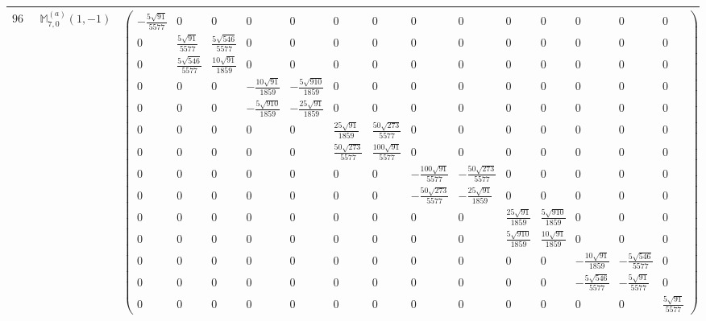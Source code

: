 \documentclass[fleqn,8pt,landscape]{jsarticle}
\begin{document}
\begin{center}
\begin{longtable}{ccc}
$ 969 $ & $ \mathbb{M}_{7,0}^{(a)}(1,-1) $ & $ \begin{pmatrix} - \frac{5 \sqrt{91}}{5577} & 0 & 0 & 0 & 0 & 0 & 0 & 0 & 0 & 0 & 0 & 0 & 0 & 0 \\ 0 & \frac{5 \sqrt{91}}{5577} & \frac{5 \sqrt{546}}{5577} & 0 & 0 & 0 & 0 & 0 & 0 & 0 & 0 & 0 & 0 & 0 \\ 0 & \frac{5 \sqrt{546}}{5577} & \frac{10 \sqrt{91}}{1859} & 0 & 0 & 0 & 0 & 0 & 0 & 0 & 0 & 0 & 0 & 0 \\ 0 & 0 & 0 & - \frac{10 \sqrt{91}}{1859} & - \frac{5 \sqrt{910}}{1859} & 0 & 0 & 0 & 0 & 0 & 0 & 0 & 0 & 0 \\ 0 & 0 & 0 & - \frac{5 \sqrt{910}}{1859} & - \frac{25 \sqrt{91}}{1859} & 0 & 0 & 0 & 0 & 0 & 0 & 0 & 0 & 0 \\ 0 & 0 & 0 & 0 & 0 & \frac{25 \sqrt{91}}{1859} & \frac{50 \sqrt{273}}{5577} & 0 & 0 & 0 & 0 & 0 & 0 & 0 \\ 0 & 0 & 0 & 0 & 0 & \frac{50 \sqrt{273}}{5577} & \frac{100 \sqrt{91}}{5577} & 0 & 0 & 0 & 0 & 0 & 0 & 0 \\ 0 & 0 & 0 & 0 & 0 & 0 & 0 & - \frac{100 \sqrt{91}}{5577} & - \frac{50 \sqrt{273}}{5577} & 0 & 0 & 0 & 0 & 0 \\ 0 & 0 & 0 & 0 & 0 & 0 & 0 & - \frac{50 \sqrt{273}}{5577} & - \frac{25 \sqrt{91}}{1859} & 0 & 0 & 0 & 0 & 0 \\ 0 & 0 & 0 & 0 & 0 & 0 & 0 & 0 & 0 & \frac{25 \sqrt{91}}{1859} & \frac{5 \sqrt{910}}{1859} & 0 & 0 & 0 \\ 0 & 0 & 0 & 0 & 0 & 0 & 0 & 0 & 0 & \frac{5 \sqrt{910}}{1859} & \frac{10 \sqrt{91}}{1859} & 0 & 0 & 0 \\ 0 & 0 & 0 & 0 & 0 & 0 & 0 & 0 & 0 & 0 & 0 & - \frac{10 \sqrt{91}}{1859} & - \frac{5 \sqrt{546}}{5577} & 0 \\ 0 & 0 & 0 & 0 & 0 & 0 & 0 & 0 & 0 & 0 & 0 & - \frac{5 \sqrt{546}}{5577} & - \frac{5 \sqrt{91}}{5577} & 0 \\ 0 & 0 & 0 & 0 & 0 & 0 & 0 & 0 & 0 & 0 & 0 & 0 & 0 & \frac{5 \sqrt{91}}{5577} \end{pmatrix} $ \\ \hline

\end{longtable}
\end{center}
\end{document}
